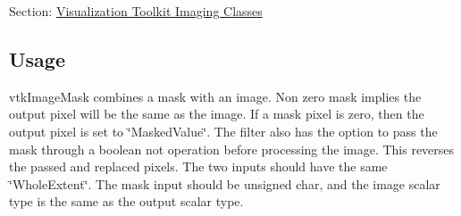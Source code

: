 Section\-: \hyperlink{sec_vtkimaging}{Visualization Toolkit Imaging Classes} \hypertarget{vtkwidgets_vtkxyplotwidget_Usage}{}\subsection{Usage}\label{vtkwidgets_vtkxyplotwidget_Usage}
vtk\-Image\-Mask combines a mask with an image. Non zero mask implies the output pixel will be the same as the image. If a mask pixel is zero, then the output pixel is set to \char`\"{}\-Masked\-Value\char`\"{}. The filter also has the option to pass the mask through a boolean not operation before processing the image. This reverses the passed and replaced pixels. The two inputs should have the same \char`\"{}\-Whole\-Extent\char`\"{}. The mask input should be unsigned char, and the image scalar type is the same as the output scalar type.

